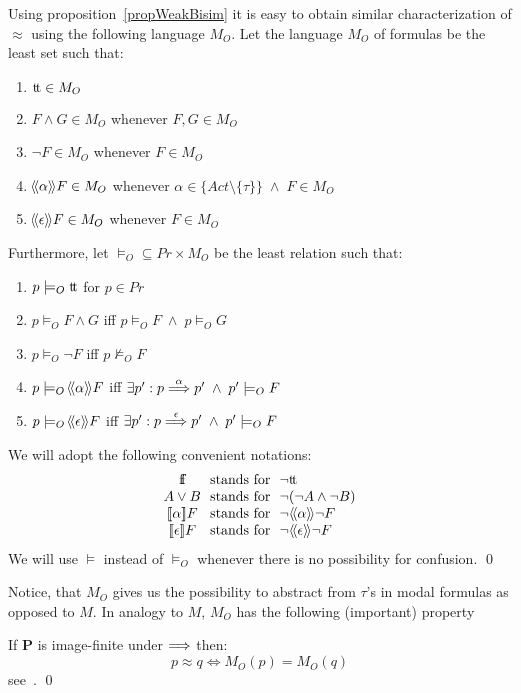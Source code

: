Using proposition~\ref{propWeakBisim} it is easy to obtain similar characterization of $\approx$ using the following language $M_O$. Let the language $M_O$ of formulas be the least set such that:
\begin{enumerate}
\item $\hbox{t}\!\hbox{t}\in M_O$
\item $F\wedge G\in M_O$  whenever $F, G\in M_O$
\item $\neg F\in M_O$ whenever $F\in M_O$
\item $\!\left<\!\left<\alpha\right>\!\right>\!F\in M_O$ whenever $\alpha\in\{Act\setminus\{\tau\}\}\;\wedge\; F\in M_O$
\item $\!\left<\!\left<\epsilon\right>\!\right>\!F\in M_O$ whenever $F\in M_O$
\end{enumerate}

\noindent
Furthermore, let $\models_O\subseteq Pr\times M_O$ be the least relation such that:
\begin{enumerate}
\item $p\models_O \hbox{t}\!\hbox{t}$ for $p\in Pr$
\item $p\models_O F\wedge G$ iff $p\models_O F\;\wedge\; p\models_O G$
\item $p\models_O \neg F$ iff $p\not\models_O F$
\item $p\models_O\!\left<\!\left<\alpha\right>\!\right>\!F$ iff $\exists p': p\stackrel{\alpha}{\Longrightarrow}p'\;\wedge\; p'\models_O F$
\item $p\models_O\!\left<\!\left<\epsilon\right>\!\right>\!F$ iff $\exists p': p\stackrel{\epsilon}{\Longrightarrow}p'\;\wedge\; p'\models_O F$
\end{enumerate}

\begin{notation}\label{notationDerShorthand}
We will adopt the following convenient notations:
\[
\begin{array}{c@{\hbox{\ \ \hbox{stands for}\ \ }}l}
\dff & \neg \dtt\\
A\vee B & \neg (\neg A\wedge\neg B)\\
\obmay{\alpha}F & \neg\obcan{\alpha}\neg F\\
\obmay{\epsilon}F & \neg\obcan{\epsilon}\neg F
\end{array}
\]
We will use $\models$ instead of $\models_O$ whenever there is no possibility for confusion.
\qed
\end{notation}

\noindent
Notice, that $M_O$ gives us the possibility to abstract from $\tau$'s in modal formulas as opposed to $M$. In analogy to $M$, $M_O$ has the following (important) property
\begin{theorem}
If {\bf P\/} is image-finite under $\stackrel{}{\Longrightarrow}$ then:
\[
p\approx q \Leftrightarrow M_O(p) = M_O(q)
\]
\proof see~\cite{HennessyMilner}.
\qed
\end{theorem}




